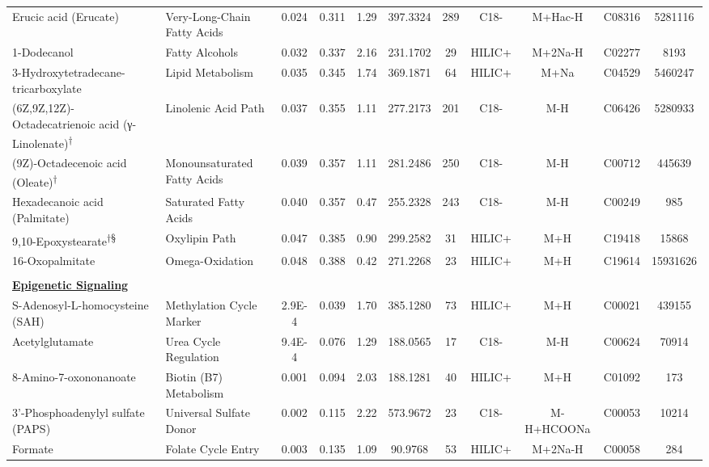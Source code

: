 \begin{longtable}[t]{llccccccccc}
\hspace*{0.3cm}Erucic acid (Erucate) & Very-Long-Chain Fatty Acids & 0.024 & 0.311 & 1.29 & 397.3324 & 289 & C18- & M+Hac-H & C08316 & 5281116\\
\hspace*{0.3cm}1-Dodecanol & Fatty Alcohols & 0.032 & 0.337 & 2.16 & 231.1702 & 29 & HILIC+ & M+2Na-H & C02277 & 8193\\
\hspace*{0.3cm}3-Hydroxytetradecane-tricarboxylate & Lipid Metabolism & 0.035 & 0.345 & 1.74 & 369.1871 & 64 & HILIC+ & M+Na & C04529 & 5460247\\
\hspace*{0.3cm}(6Z,9Z,12Z)-Octadecatrienoic acid (γ-Linolenate)\textsuperscript{†} & Linolenic Acid Path & 0.037 & 0.355 & 1.11 & 277.2173 & 201 & C18- & M-H & C06426 & 5280933\\
\hspace*{0.3cm}(9Z)-Octadecenoic acid (Oleate)\textsuperscript{†} & Monounsaturated Fatty Acids & 0.039 & 0.357 & 1.11 & 281.2486 & 250 & C18- & M-H & C00712 & 445639\\

\hspace*{0.3cm}Hexadecanoic acid (Palmitate) & Saturated Fatty Acids & 0.040 & 0.357 & 0.47 & 255.2328 & 243 & C18- & M-H & C00249 & 985\\
\hspace*{0.3cm}9,10-Epoxystearate\textsuperscript{†}\textsuperscript{§} & Oxylipin Path & 0.047 & 0.385 & 0.90 & 299.2582 & 31 & HILIC+ & M+H & C19418 & 15868\\
\hspace*{0.3cm}16-Oxopalmitate & Omega-Oxidation & 0.048 & 0.388 & 0.42 & 271.2268 & 23 & HILIC+ & M+H & C19614 & 15931626\\
 &  &  &  &  &  &  &  &  &  & \\
\fontsize{9pt}{10.8pt}\selectfont\textbf{\underline{Epigenetic Signaling}} &  &  &  &  &  &  &  &  &  & \\

\hspace*{0.3cm}S-Adenosyl-L-homocysteine (SAH) & Methylation Cycle Marker & 2.9E-4 & 0.039 & 1.70 & 385.1280 & 73 & HILIC+ & M+H & C00021 & 439155\\
\hspace*{0.3cm}Acetylglutamate & Urea Cycle Regulation & 9.4E-4 & 0.076 & 1.29 & 188.0565 & 17 & C18- & M-H & C00624 & 70914\\
\hspace*{0.3cm}8-Amino-7-oxononanoate & Biotin (B7) Metabolism & 0.001 & 0.094 & 2.03 & 188.1281 & 40 & HILIC+ & M+H & C01092 & 173\\
\hspace*{0.3cm}3'-Phosphoadenylyl sulfate (PAPS) & Universal Sulfate Donor & 0.002 & 0.115 & 2.22 & 573.9672 & 23 & C18- & M-H+HCOONa & C00053 & 10214\\
\hspace*{0.3cm}Formate & Folate Cycle Entry & 0.003 & 0.135 & 1.09 & 90.9768 & 53 & HILIC+ & M+2Na-H & C00058 & 284\\


\end{longtable}
